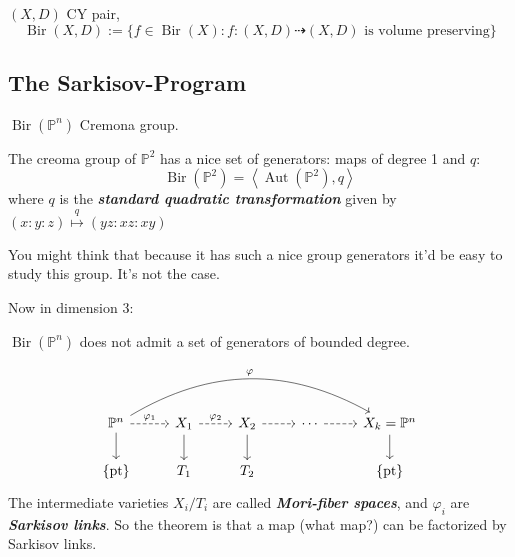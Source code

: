 \begin{remark}\leavevmode

\end{remark}

\begin{defn}\leavevmode
\((X,D)\) CY pair,
\[\operatorname{Bir}(X,D):=\{f \in \operatorname{Bir}(X) : f:(X,D) \dashrightarrow (X,D) \text{ is volume preserving} \}\]
\end{defn}

\subsection{The Sarkisov-Program}

\(\operatorname{Bir}(\mathbb{P}^n)\) Cremona group.

\begin{thm}\leavevmode
The creoma group of \(\mathbb{P}^2\) has a nice set of generators: maps of degree 1 and \(q\):
\[\operatorname{Bir}(\mathbb{P}^2) = \left<\operatorname{Aut}(\mathbb{P}^2),q\right>\]
where \(q\) is the \textit{\textbf{standard quadratic transformation}} given by \((x:y:z) \overset{q}{\mapsto }(yz:xz:xy)\)
\end{thm}

You might think that because it has such a nice group generators it'd be easy to study this group. It's not the case.

Now in dimension 3:

\begin{thm}\leavevmode
\(\operatorname{Bir}(\mathbb{P}^n)\) does not admit a set of generators of bounded degree.
\end{thm}

\begin{thm}\leavevmode
	\[\begin{tikzcd}
		\mathbb{P}^n\arrow[r,dashed,"\varphi_1"]\arrow[d]\arrow[rrrr,bend left,"\varphi"]&X_1\arrow[r,dashed,"\varphi_2"]\arrow[d]&X_2\arrow[r,dashed]\arrow[d]&\cdots \arrow[r,dashed]&X_k=\mathbb{P}^n\arrow[d]\\
	\{\operatorname{pt}\}	&T_1&T_2&&\{\operatorname{pt}\}
	\end{tikzcd}\]
The intermediate varieties \(X_i/T_i\) are called \textit{\textbf{Mori-fiber spaces}}, and \(\varphi_i\) are \textit{\textbf{Sarkisov links}}. So the theorem is that a map (what map?) can be factorized by Sarkisov links.
\end{thm}

